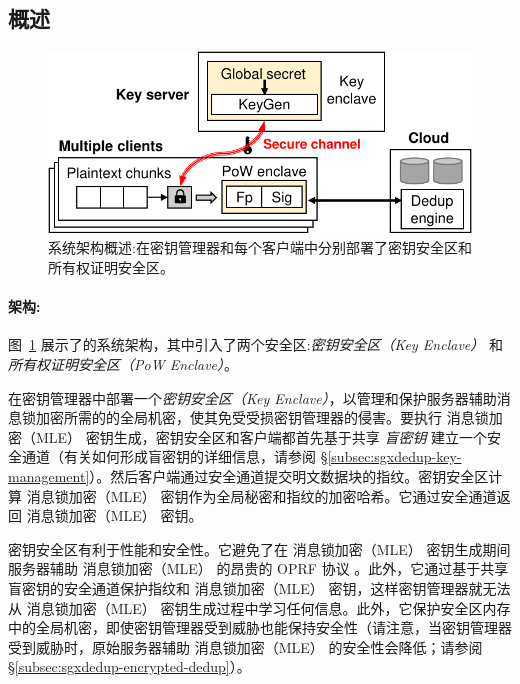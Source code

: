 \subsection{概述}
\label{subsec:sgxdedup-arch}

\begin{figure}[t]
\centering
\includegraphics[width=\textwidth]{pic/sgxdedup/overview.pdf}
\caption{\sysnameS 系统架构概述:\sysnameS 在密钥管理器和每个客户端中分别部署了密钥安全区和所有权证明安全区。}
\label{fig:sgxdedup-overview}
\vspace{-3pt}
\end{figure}

\paragraph*{架构:} 图~\ref{fig:sgxdedup-overview} 展示了\sysnameS 的系统架构，其中引入了两个安全区:\textit{密钥安全区（Key Enclave）} 和 \textit{所有权证明安全区（PoW Enclave）}。 

\sysnameS 在密钥管理器中部署一个\textit{密钥安全区（Key Enclave）}，以管理和保护服务器辅助消息锁加密所需的的全局机密，使其免受受损密钥管理器的侵害。要执行 消息锁加密（MLE） 密钥生成，密钥安全区和客户端都首先基于共享 \textit{盲密钥} 建立一个安全通道（有关如何形成盲密钥的详细信息，请参阅 \S\ref{subsec:sgxdedup-key-management}）。然后客户端通过安全通道提交明文数据块的指纹。密钥安全区计算 消息锁加密（MLE） 密钥作为全局秘密和指纹的加密哈希。它通过安全通道返回 消息锁加密（MLE） 密钥。

密钥安全区有利于性能和安全性。它避免了在 消息锁加密（MLE） 密钥生成期间服务器辅助 消息锁加密（MLE） 的昂贵的 OPRF 协议 \cite{bellare13b}。此外，它通过基于共享盲密钥的安全通道保护指纹和 消息锁加密（MLE） 密钥，这样密钥管理器就无法从 消息锁加密（MLE） 密钥生成过程中学习任何信息。此外，它保护安全区内存中的全局机密，即使密钥管理器受到威胁也能保持安全性（请注意，当密钥管理器受到威胁时，原始服务器辅助 消息锁加密（MLE） 的安全性会降低；请参阅 \S\ref{subsec:sgxdedup-encrypted-dedup}）。

